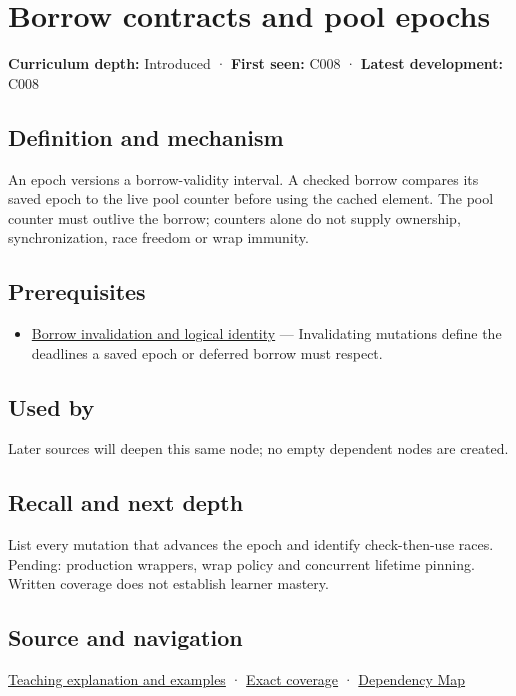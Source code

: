 \hypertarget{appendix-aa405b7c3903}{}\label{referencestart:appendix-aa405b7c3903}
\section{Borrow contracts and pool epochs}\label{appendix-aa405b7c3903-borrow-contracts-and-pool-epochs}

\textbf{Curriculum depth:} Introduced · \textbf{First seen:} C008 · \textbf{Latest development:} C008

\subsection{Definition and mechanism}\label{appendix-aa405b7c3903-definition-and-mechanism}

An epoch versions a borrow-validity interval. A checked borrow compares its saved epoch to the live pool counter before using the cached element. The pool counter must outlive the borrow; counters alone do not supply ownership, synchronization, race freedom or wrap immunity.

\subsection{Prerequisites}\label{appendix-aa405b7c3903-prerequisites}

\begin{itemize}
\tightlist
\item
  \hyperref[appendix-f9b8b9188c7f]{Borrow invalidation and logical identity} --- Invalidating mutations define the deadlines a saved epoch or deferred borrow must respect.
\end{itemize}

\subsection{Used by}\label{appendix-aa405b7c3903-used-by}

Later sources will deepen this same node; no empty dependent nodes are created.

\subsection{Recall and next depth}\label{appendix-aa405b7c3903-recall-and-next-depth}

List every mutation that advances the epoch and identify check-then-use races. Pending: production wrappers, wrap policy and concurrent lifetime pinning. Written coverage does not establish learner mastery.

\subsection{Source and navigation}\label{appendix-aa405b7c3903-source-and-navigation}

\hyperref[01-foundations-i-ch003-when-a-valid-borrow-stops-naming-the-intended-thing]{Teaching explanation and examples} · \hyperref[appendix-fd090d982a15-m008---parts-113-126]{Exact coverage} · \hyperref[appendix-4ad47bdd269a]{Dependency Map}
